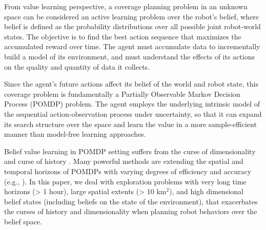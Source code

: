\documentclass[letterpaper]{article} %
\newcommand{\ph}[1]{{\textbf{#1}:}} %
\begin{document}


From value learning perspective, a coverage planning problem in an unknown space can be considered an active learning problem over the robot's belief, where belief is defined as the probability distributions over all possible joint robot-world states.
%
The objective is to find the best action sequence that maximizes the accumulated reward over time.  The agent must accumulate data to incrementally build a model of its environment, and must understand the effects of its actions on the quality and quantity of data it collects.

Since the agent's future actions affect its belief of the world and robot state, this coverage problem is fundamentally a Partially Observable Markov Decision Process (POMDP) problem.
The agent employs the underlying intrinsic model of the sequential action-observation process under uncertainty, so that it can %
expand its search structure over the space and learn the value in a more sample-efficient manner than model-free learning approaches.


Belief value learning in POMDP setting suffers from the curse of dimensionality \cite{KLC98} and curse of history \cite{Pineau03}. Many powerful methods are extending the spatial and temporal horizons of POMDPs with varying degrees of efficiency and accuracy (e.g., \cite{silver2010monte,somani2013despot,bonet1998learning,kim2019pomhdp}). In this paper, we deal with exploration problems with very long time horizons (> 1 hour), large spatial extents (> 10 km$^2$), and high dimensional belief states (including beliefs on the state of the environment), that exacerbates the curses of history and dimensionality when planning robot behaviors over the belief space.
%
\end{document}
